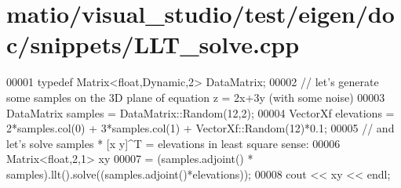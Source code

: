 \hypertarget{matio_2visual__studio_2test_2eigen_2doc_2snippets_2_l_l_t__solve_8cpp_source}{}\section{matio/visual\+\_\+studio/test/eigen/doc/snippets/\+L\+L\+T\+\_\+solve.cpp}
\label{matio_2visual__studio_2test_2eigen_2doc_2snippets_2_l_l_t__solve_8cpp_source}

\begin{DoxyCode}
00001 \textcolor{keyword}{typedef} Matrix<float,Dynamic,2> DataMatrix;
00002 \textcolor{comment}{// let's generate some samples on the 3D plane of equation z = 2x+3y (with some noise)}
00003 DataMatrix samples = DataMatrix::Random(12,2);
00004 VectorXf elevations = 2*samples.col(0) + 3*samples.col(1) + VectorXf::Random(12)*0.1;
00005 \textcolor{comment}{// and let's solve samples * [x y]^T = elevations in least square sense:}
00006 Matrix<float,2,1> xy
00007  = (samples.adjoint() * samples).llt().solve((samples.adjoint()*elevations));
00008 cout << xy << endl;
\end{DoxyCode}
